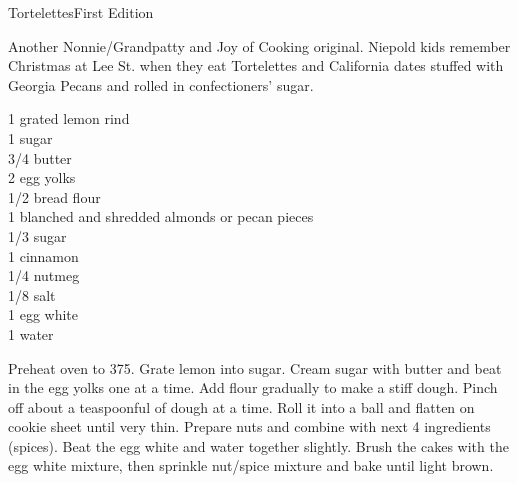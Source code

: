 \begin{entry}{Tortelettes}{First Edition}

\begin{open}
  Another Nonnie/Grandpatty and Joy of Cooking original. Niepold kids remember
  Christmas at Lee St. when they eat Tortelettes and California dates stuffed
  with Georgia Pecans and rolled in confectioners' sugar.
\end{open}
\begin{ingredients}
  1 grated lemon rind\\
  \SI{1}{\cup} sugar\\
  \SI{3/4}{\cup} butter\\
  2 egg yolks \\
  \SI{1/2}{\cup} bread flour \\
  \SI{1}{\cup} blanched and shredded almonds or pecan pieces \\
  \SI{1/3}{\cup} sugar \\
  \SI{1}{\teaspoon} cinnamon\\
  \SI{1/4}{\teaspoon} nutmeg\\
  \SI{1/8}{\teaspoon} salt\\
  1 egg white\\
  \SI{1}{\tblspoon} water
\end{ingredients}
Preheat oven to \SI{375}{\degreeF}. Grate lemon into sugar. Cream sugar with
butter and beat in the egg yolks one at a time. Add flour gradually to make a
stiff dough. Pinch off about a teaspoonful of dough at a time. Roll it into a
ball and flatten on cookie sheet until very thin. Prepare nuts and combine
with next 4 ingredients (spices). Beat the egg white and water together
slightly.  Brush the cakes with the egg white mixture, then sprinkle nut/spice
mixture and bake until light brown.
\end{entry}

